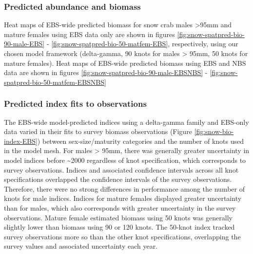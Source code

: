 \documentclass[
]{article}
\begin{document}
\subsubsection*{Predicted abundance and biomass}\label{predicted-abundance-and-biomass-1}

Heat maps of EBS-wide predicted biomass for snow crab males \textgreater95mm and mature females using EBS data only are shown in figures \ref{fig:snow-spatpred-bio-90-male-EBS} - \ref{fig:snow-spatpred-bio-50-matfem-EBS}, respectively, using our chosen model framework (delta-gamma, 90 knots for males \textgreater{} 95mm, 50 knots for mature females). Heat maps of EBS-wide predicted biomass using EBS and NBS data are shown in figures \ref{fig:snow-spatpred-bio-90-male-EBSNBS} - \ref{fig:snow-spatpred-bio-50-matfem-EBSNBS}

\subsubsection*{Predicted index fits to observations}\label{predicted-index-fits-to-observations-1}

The EBS-wide model-predicted indices using a delta-gamma family and EBS-only data varied in their fits to survey biomass observations (Figure \ref{fig:snow-bio-index-EBS}) between sex-size/maturity categories and the number of knots used in the model mesh. For males \textgreater{} 95mm, there was generally greater uncertainty in model indices before \textasciitilde2000 regardless of knot specification, which corresponds to survey observations. Indices and associated confidence intervals across all knot specifications overlapped the confidence intervals of the survey observations. Therefore, there were no strong differences in performance among the number of knots for male indices. Indices for mature females displayed greater uncertainty than for males, which also corresponds with greater uncertainty in the survey observations. Mature female estimated biomass using 50 knots was generally slightly lower than biomass using 90 or 120 knots. The 50-knot index tracked survey observations more so than the other knot specifications, overlapping the survey values and associated uncertainty each year.
\end{document}
